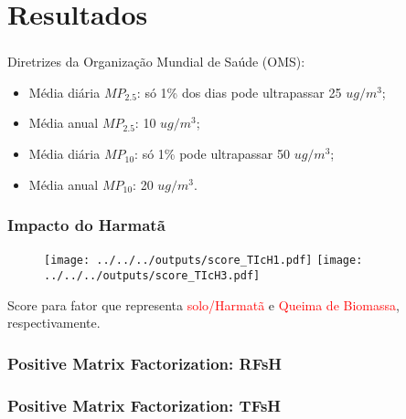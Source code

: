 \section{Resultados}


\begin{frame}
  \frametitle{}
  \begin{table}
    
  \end{table}
   Diretrizes da Organização Mundial de Saúde (OMS):
  \begin{itemize}
    \item Média diária $MP_{2.5}$: só 1\% dos dias pode ultrapassar 25 $ug/m^3$;
    \item Média anual $MP_{2.5}$: 10 $ug/m^3$;
    \item Média diária $MP_{10}$: só 1\%  pode ultrapassar 50 $ug/m^3$;
    \item Média anual $MP_{10}$: 20 $ug/m^3$.
  \end{itemize}
\end{frame}

\begin{frame}
  \frametitle{}
    
\end{frame}

\begin{frame}
  \frametitle{}
    
\end{frame}

\begin{frame}
  \frametitle{Impacto do Harmatã}
  \begin{figure}[H]
   \centering
    \texttt{[image: ../../../outputs/score\_TIcH1.pdf]}
    \texttt{[image: ../../../outputs/score\_TIcH3.pdf]}
  \end{figure}
   Score para fator que representa \textcolor{red}{solo/Harmatã} 
   e \textcolor{red}{Queima de Biomassa}, respectivamente.
\end{frame}

\begin{frame}
  \frametitle{Positive Matrix Factorization: RFsH}
    \begin{tiny}
      
      
    \end{tiny}
\end{frame}

\begin{frame}
  \frametitle{Positive Matrix Factorization: TFsH}
    \begin{tiny}
      
      
    \end{tiny}
\end{frame}



